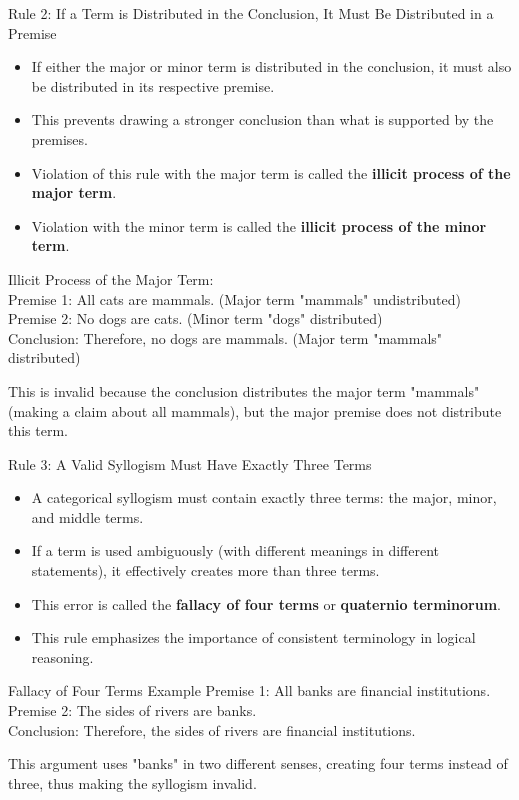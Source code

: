 \documentclass{beamer}
\begin{document}
	\begin{frame}{Rule 2: If a Term is Distributed in the Conclusion, It Must Be Distributed in a Premise}
		\begin{itemize}
			\item If either the major or minor term is distributed in the conclusion, it must also be distributed in its respective premise.
			\item This prevents drawing a stronger conclusion than what is supported by the premises.
			\item Violation of this rule with the major term is called the \textbf{illicit process of the major term}.
			\item Violation with the minor term is called the \textbf{illicit process of the minor term}.
		\end{itemize}
		
		\begin{example}
			\scriptsize
			Illicit Process of the Major Term:\\
			Premise 1: All cats are mammals. (Major term "mammals" undistributed)\\
			Premise 2: No dogs are cats. (Minor term "dogs" distributed)\\
			Conclusion: Therefore, no dogs are mammals. (Major term "mammals" distributed)
			
			This is invalid because the conclusion distributes the major term "mammals" (making a claim about all mammals), but the major premise does not distribute this term.
		\end{example}
	\end{frame}
	
	\begin{frame}{Rule 3: A Valid Syllogism Must Have Exactly Three Terms}
		\begin{itemize}
			\item A categorical syllogism must contain exactly three terms: the major, minor, and middle terms.
			\item If a term is used ambiguously (with different meanings in different statements), it effectively creates more than three terms.
			\item This error is called the \textbf{fallacy of four terms} or \textbf{quaternio terminorum}.
			\item This rule emphasizes the importance of consistent terminology in logical reasoning.
		\end{itemize}
		
		\begin{alertblock}{Fallacy of Four Terms Example}
			Premise 1: All banks are financial institutions.\\
			Premise 2: The sides of rivers are banks.\\
			Conclusion: Therefore, the sides of rivers are financial institutions.
			
			This argument uses "banks" in two different senses, creating four terms instead of three, thus making the syllogism invalid.
		\end{alertblock}
	\end{frame}
	
\end{document}
